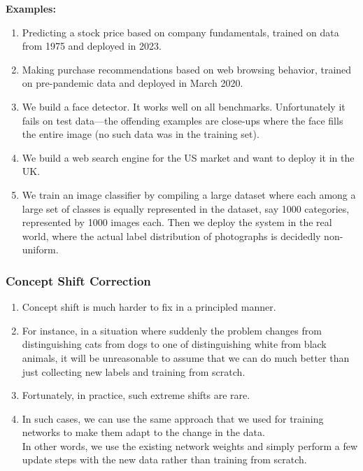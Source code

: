 \vspace{0.2cm}
\textbf{Examples:}
\begin{enumerate}
    \item Predicting a stock price based on company fundamentals, trained on data from 1975 and deployed in 2023.
    
    \item Making purchase recommendations based on web browsing behavior, trained on pre-pandemic data and deployed in March 2020.
    
    \item We build a face detector. It works well on all benchmarks. Unfortunately it fails on test data—the offending examples are close-ups where the face fills the entire image (no such data was in the training set).

    \item We build a web search engine for the US market and want to deploy it in the UK.

    \item We train an image classifier by compiling a large dataset where each among a large set of classes is equally represented in the dataset, say 1000 categories, represented by 1000 images each. Then we deploy the system in the real world, where the actual label distribution of photographs is decidedly non-uniform.
\end{enumerate}


\subsubsection{Concept Shift Correction \cite{dnn-1}} \label{Concept Shift Correction}

\begin{enumerate}
    \item Concept shift is much harder to fix in a principled manner. 
    
    \item For instance, in a situation where suddenly the problem changes from distinguishing cats from dogs to one of distinguishing white from black animals, it will be unreasonable to assume that we can do much better than just collecting new labels and training from scratch. 
    
    \item Fortunately, in practice, such extreme shifts are rare.

    \item In such cases, we can use the same approach that we used for training networks to make them adapt to the change in the data.\\
    In other words, we use the existing network weights and simply perform a few update steps with the new data rather than training from scratch.
\end{enumerate}



